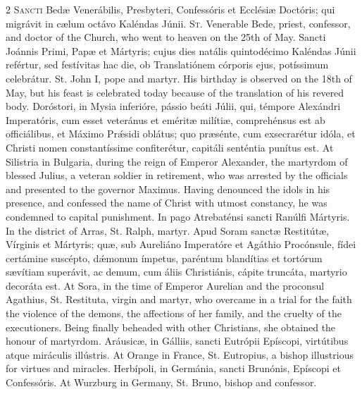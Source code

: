 \begin{paracol}{2}
\lettrine[lines=2]{S}{ancti} Bedæ Venerábilis, 
 Presbyteri, Confessóris et Ecclésiæ Doctóris; qui migrávit in cælum octávo 
 Kaléndas Júnii.
\switchcolumn
{}
\lettrine[lines=2]{S}{t.} Venerable Bede, priest, 
 confessor, and doctor of the Church, who went to heaven on the 25th of May.
\switchcolumn*
{}
Sancti Joánnis Primi, 
 Papæ et Mártyris; cujus dies natális quintodécimo Kaléndas Júnii refértur, 
 sed festívitas hac die, ob Translatiónem córporis ejus, potíssimum 
 celebrátur.
\switchcolumn
{}
St. John I, pope and martyr. 
 His birthday is observed on the 18th of May, but his feast is celebrated 
 today because of the translation of his revered body.
\switchcolumn*
{}
Doróstori, in Mysia 
 inferióre, pássio beáti Júlii, qui, témpore Alexándri Imperatóris, cum esset 
 veteránus et eméritæ milítiæ, comprehénsus est ab officiálibus, et Máximo 
 Prǽsidi oblátus; quo præsénte, cum exsecrarétur idóla, et Christi nomen 
 constantíssime confiterétur, capitáli senténtia punítus est.
\switchcolumn
{}
At Silistria in Bulgaria, during 
 the reign of Emperor Alexander, the martyrdom of blessed Julius, a veteran 
 soldier in retirement, who was arrested by the officials and presented to 
 the governor Maximus. Having denounced the idols in his presence, and 
 confessed the name of Christ with utmost constancy, he was condemned to 
 capital punishment.
\switchcolumn*
{}
In pago Atrebaténsi 
 sancti Ranúlfi Mártyris.
\switchcolumn
{}
In the district of Arras, St. 
 Ralph, martyr.
\switchcolumn*
{}
Apud Soram sanctæ 
 Restitútæ, Vírginis et Mártyris; quæ, sub Aureliáno Imperatóre et Agáthio 
 Procónsule, fídei certámine suscépto, dǽmonum ímpetus, paréntum blandítias 
 et tortórum sævítiam superávit, ac demum, cum áliis Christiánis, cápite 
 truncáta, martyrio decoráta est.
\switchcolumn
{}
At Sora, in the time of Emperor 
 Aurelian and the proconsul Agathius, St. Restituta, virgin and martyr, who 
 overcame in a trial for the faith the violence of the demons, the affections 
 of her family, and the cruelty of the executioners. Being finally 
 beheaded with other Christians, she obtained the honour of martyrdom.
\switchcolumn*
{}
Aráusicæ, in Gálliis, 
 sancti Eutrópii Epíscopi, virtútibus atque miráculis illústris.
\switchcolumn
{}
At Orange in France, St. Eutropius, 
 a bishop illustrious for virtues and miracles.
\switchcolumn*
{}
Herbípoli, in Germánia, 
 sancti Brunónis, Epíscopi et Confessóris.
\switchcolumn
{}
At Wurzburg in Germany, St. Bruno, 
 bishop and confessor.
\switchcolumn*
{}
\end{paracol}


